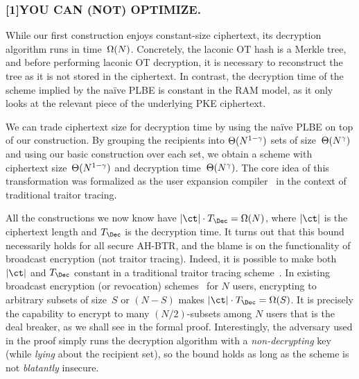 \subsubsection{\scalebox{0.8}[1]{{\bfseries\selectfont YOU CAN (NOT) OPTIMIZE\@.}}}
While our first construction enjoys constant-size ciphertext,
its decryption algorithm runs in time~$\operatorname{\Omega}(N)$.
Concretely, the laconic OT hash is a Merkle tree, and before performing laconic OT decryption, it is necessary to reconstruct the tree as it is not stored in the ciphertext.
In contrast, the decryption time of the scheme implied by the na{\"i}ve PLBE is constant in the RAM model, as it only looks at the relevant piece of the underlying PKE ciphertext.

We can trade ciphertext size for decryption time by using the na{\"i}ve PLBE on top of our construction.
By grouping the recipients into $\operatorname{\Theta}(N^{1-\gamma})$ sets of size~$\operatorname{\Theta}(N^\gamma)$ and using our basic construction over each set, we obtain a scheme with ciphertext size~$\operatorname{\Theta}(N^{1-\gamma})$ and decryption time~$\operatorname{\Theta}(N^\gamma)$.
The core idea of this transformation was formalized as the user expansion compiler~\cite{C:Zhandry20} in the context of traditional traitor tracing.

All the constructions we now know have ${|\ct|\cdot T_\Dec=\bigOmega(N)}$,
where $|\ct|$ is the ciphertext length and $T_\Dec$ is the decryption time.
It turns out that this bound necessarily holds for all secure AH-BTR, and
the blame is on the functionality of broadcast encryption (not traitor tracing).
Indeed, 
it is possible to make both $|\ct|$ and $T_\Dec$ constant in a traditional traitor tracing scheme~\cite{C:BonZha14}.
In existing broadcast encryption (or revocation) schemes~\cite{C:BonGenWat05,AC:Delerablee07,EC:GenWat09,C:BonZha14,EC:AgrYam20,TCC:AgrWicYam20,EPRINT:BraVai20} for $N$ users,
encrypting to arbitrary subsets of size~$S$ or $({N-S})$ makes ${|\ct|\cdot T_\Dec=\bigOmega(S)}$.
It is precisely the capability to encrypt to many ${(N/2)}$-subsets among $N$ users that is the deal breaker, as we shall see in the formal proof.
Interestingly,
the adversary used in the proof
simply runs the decryption algorithm with a \emph{non-decrypting} key
(while \emph{lying} about the recipient set),
so the bound holds as long as the scheme is not \emph{blatantly} insecure.

